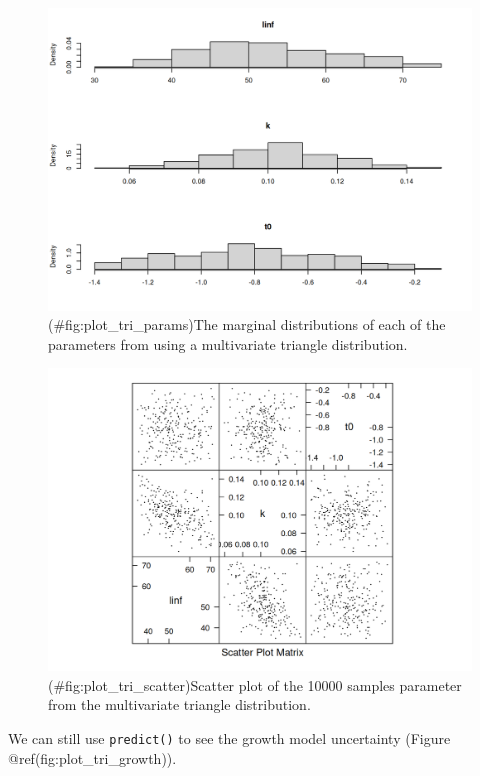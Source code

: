 \documentclass[
]{book}
\begin{document}
\begin{figure}
\centering
\includegraphics{_bookdown_files/_main_files/figure-html/plot_tri_params-1.png}
\caption{(\#fig:plot\_tri\_params)The marginal distributions of each of the parameters from using a multivariate triangle distribution.}
\end{figure}

\begin{figure}
\centering
\includegraphics{_bookdown_files/_main_files/figure-html/plot_tri_scatter-1.png}
\caption{(\#fig:plot\_tri\_scatter)Scatter plot of the 10000 samples parameter from the multivariate triangle distribution.}
\end{figure}

We can still use \texttt{predict()} to see the growth model uncertainty (Figure @ref(fig:plot\_tri\_growth)).
\end{document}

